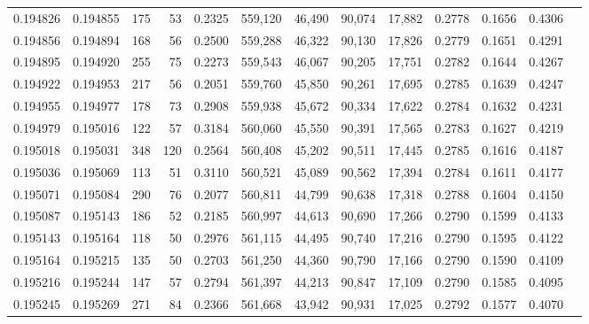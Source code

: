 \begin{tabular}{rrrrrrrrrrrrr}
0.194826 & 0.194855 &   175 &  53 &                                     0.2325 & 559,120 &  46,490 &  90,074 &  17,882 & 0.2778 & 0.1656 & 0.4306 \\
0.194856 & 0.194894 &   168 &  56 &                                     0.2500 & 559,288 &  46,322 &  90,130 &  17,826 & 0.2779 & 0.1651 & 0.4291 \\
0.194895 & 0.194920 &   255 &  75 &                                     0.2273 & 559,543 &  46,067 &  90,205 &  17,751 & 0.2782 & 0.1644 & 0.4267 \\
0.194922 & 0.194953 &   217 &  56 &                                     0.2051 & 559,760 &  45,850 &  90,261 &  17,695 & 0.2785 & 0.1639 & 0.4247 \\
0.194955 & 0.194977 &   178 &  73 &                                     0.2908 & 559,938 &  45,672 &  90,334 &  17,622 & 0.2784 & 0.1632 & 0.4231 \\
0.194979 & 0.195016 &   122 &  57 &                                     0.3184 & 560,060 &  45,550 &  90,391 &  17,565 & 0.2783 & 0.1627 & 0.4219 \\
0.195018 & 0.195031 &   348 & 120 &                                     0.2564 & 560,408 &  45,202 &  90,511 &  17,445 & 0.2785 & 0.1616 & 0.4187 \\
0.195036 & 0.195069 &   113 &  51 &                                     0.3110 & 560,521 &  45,089 &  90,562 &  17,394 & 0.2784 & 0.1611 & 0.4177 \\
0.195071 & 0.195084 &   290 &  76 &                                     0.2077 & 560,811 &  44,799 &  90,638 &  17,318 & 0.2788 & 0.1604 & 0.4150 \\
0.195087 & 0.195143 &   186 &  52 &                                     0.2185 & 560,997 &  44,613 &  90,690 &  17,266 & 0.2790 & 0.1599 & 0.4133 \\
0.195143 & 0.195164 &   118 &  50 &                                     0.2976 & 561,115 &  44,495 &  90,740 &  17,216 & 0.2790 & 0.1595 & 0.4122 \\
0.195164 & 0.195215 &   135 &  50 &                                     0.2703 & 561,250 &  44,360 &  90,790 &  17,166 & 0.2790 & 0.1590 & 0.4109 \\
0.195216 & 0.195244 &   147 &  57 &                                     0.2794 & 561,397 &  44,213 &  90,847 &  17,109 & 0.2790 & 0.1585 & 0.4095 \\
0.195245 & 0.195269 &   271 &  84 &                                     0.2366 & 561,668 &  43,942 &  90,931 &  17,025 & 0.2792 & 0.1577 & 0.4070 \\

\end{tabular}
